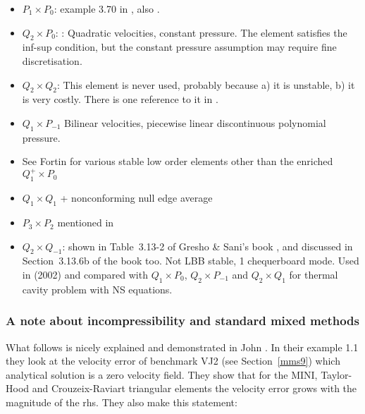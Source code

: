 \begin{itemize}
\item $P_1\times P_0$: example 3.70 in \cite{john16}, also \cite{john98}. 
\item $Q_2\times P_0$: : 
Quadratic velocities, constant pressure. The element satisfies the inf-sup condition, but the constant pressure assumption may require fine discretisation.

\item $Q_2\times Q_2$: This element is never used, probably because a) it is unstable, b) it is very costly. 
There is one reference to it in \cite{hufb86}.
\item $Q_1\times P_{-1}$ Bilinear velocities,  piecewise linear discontinuous polynomial pressure.
\item See Fortin \cite{fort81} for various stable low order elements other than the enriched $Q_1^+ \times P_0$
\item $Q_1\times Q_1$ + nonconforming null edge average \cite{fros07}
\item $P_3\times P_2$ mentioned in \cite{sten90}   

\item $Q_2 \times Q_{-1}$: shown in Table~3.13-2 of Gresho \& Sani's book \cite{grsa}, 
and discussed in Section~3.13.6b of the book too. Not LBB stable, 1 chequerboard mode.
Used in \textcite{grsu02} (2002) and compared with $Q_1\times P_0$, $Q_2\times P_{-1}$ and 
$Q_2\times Q_1$ for thermal cavity problem with NS equations.

\end{itemize}

\subsubsection{A note about incompressibility and standard mixed methods}

What follows is nicely explained and demonstrated in John \etal \cite{jolm17}. In their 
example 1.1 they look at the velocity error of benchmark VJ2 (see Section~\ref{mms9}) 
which analytical solution is a zero velocity field. They show that for the MINI, 
Taylor-Hood and Crouzeix-Raviart triangular elements the velocity error grows 
with the magnitude of the rhs. They also make this statement:




